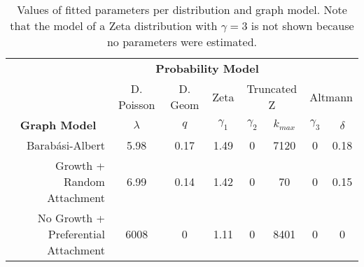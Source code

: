 \begin{table}[!htb]
\centering
\begin{tabular}{cccccccc}
\multicolumn{1}{r}{\textbf{}} & \multicolumn{5}{c}{\textbf{Probability Model}} \\ \cline{2-8} 
\multicolumn{1}{c}{\textbf{}} &
  \multicolumn{1}{c}{D. Poisson} &
  \multicolumn{1}{c}{D. Geom} &
  \multicolumn{1}{c}{Zeta} &
  \multicolumn{2}{c}{Truncated Z} &
  \multicolumn{2}{c}{Altmann} \\
\multicolumn{1}{c}{\textbf{Graph Model}} &
  \multicolumn{1}{c}{$\lambda$} &
  \multicolumn{1}{c}{$q$} &
  \multicolumn{1}{c}{$\gamma_1$} &
  \multicolumn{1}{c}{$\gamma_2$} &
  \multicolumn{1}{c}{$k_{max}$}  &
  \multicolumn{1}{c}{$\gamma_3$} &
  \multicolumn{1}{c}{$\delta$} \\ \midrule
\multicolumn{1}{r}{Barabási-Albert} & 5.98 & 0.17 & 1.49 & 0 & 7120 & 0 & 0.18 \\
\multicolumn{1}{r}{Growth + Random Attachment} & 6.99 & 0.14 & 1.42 & 0 & 70 & 0 & 0.15 \\
\multicolumn{1}{r}{No Growth + Preferential Attachment} & 6008 & 0 & 1.11 & 0 & 8401 & 0 & 0 \\
\bottomrule
\end{tabular}
\caption{Values of fitted parameters per distribution and graph model. Note that the model of a Zeta distribution with $\gamma = 3$ is not shown because no parameters were estimated.} \label{tab:fitted}
\end{table}